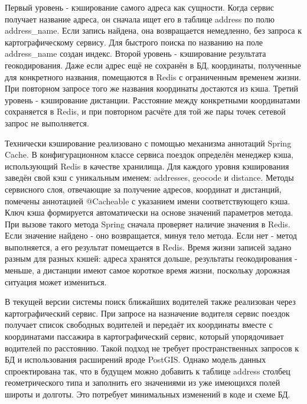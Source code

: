 {  \par \redline Первый уровень - кэширование самого адреса как сущности. Когда сервис получает название адреса, он сначала ищет его в таблице address по полю address\_name. Если запись найдена, она возвращается немедленно, без запроса к картографическому сервису. Для быстрого поиска по названию на поле address\_name создан индекс. Второй уровень - кэширование результата геокодирования. Даже если адрес ещё не сохранён в БД, координаты, полученные для конкретного названия, помещаются в Redis с ограниченным временем жизни. При повторном запросе того же названия координаты достаются из кэша. Третий уровень - кэширование дистанции. Расстояние между конкретными координатами сохраняется в Redis, и при повторном расчёте для той же пары точек сетевой запрос не выполняется.

\par \redline Технически кэширование реализовано с помощью механизма аннотаций Spring Cache. В конфигурационном классе сервиса поездок определён менеджер кэша, использующий Redis в качестве хранилища. Для каждого уровня кэширования заведён свой кэш с уникальным именем: addresses, geocode и distance. Методы сервисного слоя, отвечающие за получение адресов, координат и дистанций, помечены аннотацией @Cacheable с указанием имени соответствующего кэша. Ключ кэша формируется автоматически на основе значений параметров метода. При вызове такого метода Spring сначала проверяет наличие значения в Redis. Если значение найдено - оно возвращается, минуя тело метода. Если нет - метод выполняется, а его результат помещается в Redis. Время жизни записей задано разным для разных кэшей: адреса хранятся дольше, результаты геокодирования - меньше, а дистанции имеют самое короткое время жизни, поскольку дорожная ситуация может измениться.

  \par \redline В текущей версии системы поиск ближайших водителей также реализован через картографический сервис. При запросе на назначение водителя сервис поездок получает список свободных водителей и передаёт их координаты вместе с координатами пассажира в картографический сервис, который упорядочивает водителей по расстоянию. Такой подход не требует пространственных запросов к БД и использования расширений вроде PostGIS. Однако модель данных спроектирована так, что в будущем можно добавить к таблице address столбец геометрического типа и заполнить его значениями из уже имеющихся полей широты и долготы. Это потребует минимальных изменений в коде и схеме БД.

  \par
}

